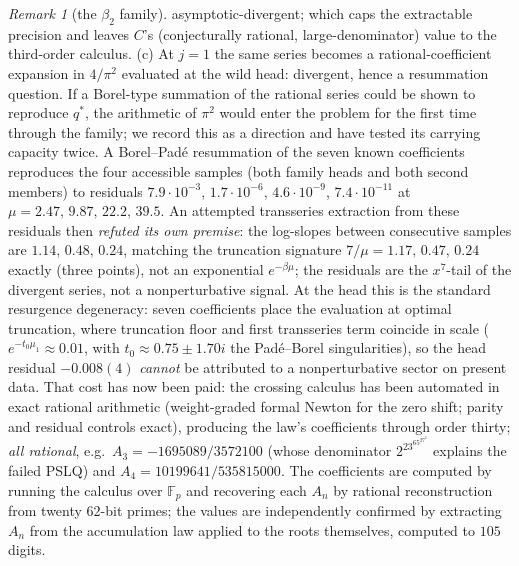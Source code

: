 \documentclass[11pt]{article}
\theoremstyle{plain}
\theoremstyle{definition}
\theoremstyle{remark}
\newtheorem{remark}[theorem]{Remark}
\newcommand{\F}{\mathbb{F}}
\begin{document}
\begin{remark}[the $\beta_2$ family]
asymptotic-divergent; which caps the extractable precision and leaves $C$'s (conjecturally
rational, large-denominator) value to the third-order calculus. (c) At $j=1$ the same series
becomes a rational-coefficient expansion in $4/\pi^2$ evaluated at the wild head: divergent, hence
a resummation question. If a Borel-type summation of the rational series could be shown to
reproduce $q^\ast$, the arithmetic of $\pi^2$ would enter the problem for the first time through
the family; we record this as a direction and have tested its carrying capacity twice. A Borel--Pad\'e
resummation of the seven known coefficients reproduces the four accessible samples (both family
heads and both second members) to residuals $7.9\cdot10^{-3}$, $1.7\cdot10^{-6}$,
$4.6\cdot10^{-9}$, $7.4\cdot10^{-11}$ at $\mu=2.47,\,9.87,\,22.2,\,39.5$. An attempted
transseries extraction from these residuals then \emph{refuted its own premise}: the log-slopes
between consecutive samples are $1.14,\,0.48,\,0.24$, matching the truncation signature $7/\mu
=1.17,\,0.47,\,0.24$ exactly (three points), not an exponential $e^{-\beta\mu}$; the
residuals are the $x^7$-tail of the divergent series, not a nonperturbative signal. At the head
this is the standard resurgence degeneracy: seven coefficients place the evaluation at optimal
truncation, where truncation floor and first transseries term coincide in scale
($e^{-t_0\mu_1}\approx0.01$, with $t_0\approx0.75\pm1.70i$ the Pad\'e--Borel singularities),
so the head residual $-0.008(4)$ \emph{cannot} be attributed to a nonperturbative sector on
present data. That cost has now been paid: the crossing calculus has been automated in exact rational
arithmetic (weight-graded formal Newton for the zero shift; parity and residual controls exact),
producing the law's coefficients through order thirty; \emph{all rational}, e.g.\
$A_3=-1695089/3572100$ (whose denominator $2^23^65^27^2$ explains the failed PSLQ) and
$A_4=10199641/535815000$. The coefficients are computed by running the calculus over $\F_p$ and
recovering each $A_n$ by rational reconstruction from twenty $62$-bit primes; the values are
independently confirmed by extracting $A_n$ from the accumulation law applied to the roots
themselves, computed to $105$ digits.


\end{remark}
\end{document}
